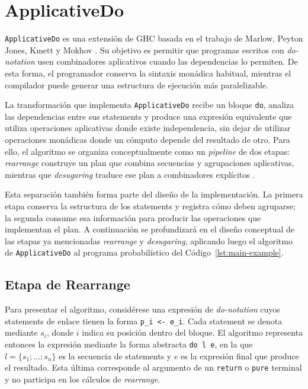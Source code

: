 
\section{ApplicativeDo}

\texttt{ApplicativeDo} es una extensión de \textsf{GHC} basada en el trabajo de Marlow, Peyton Jones, Kmett y Mokhov \cite{MarlowPJKM2016}. Su objetivo es permitir que programas escritos con \textit{do-notation} usen combinadores aplicativos cuando las dependencias lo permiten. De esta forma, el programador conserva la sintaxis monádica habitual, mientras el compilador puede generar una estructura de ejecución más paralelizable.

La transformación que implementa \texttt{ApplicativeDo} recibe un bloque \texttt{do}, analiza las dependencias entre sus statements y produce una expresión equivalente que utiliza operaciones aplicativas donde existe independencia, sin dejar de utilizar operaciones monádicas donde un cómputo depende del resultado de otro. Para ello, el algoritmo se organiza conceptualmente como un \textit{pipeline} de dos etapas: \textit{rearrange} construye un plan que combina secuencias y agrupaciones aplicativas, mientras que \textit{desugaring} traduce ese plan a combinadores explícitos \cite[pp.~95--96]{MarlowPJKM2016}.

Esta separación también forma parte del diseño de la implementación. La primera etapa conserva la estructura de los statements y registra cómo deben agruparse; la segunda consume esa información para producir las operaciones que implementan el plan. A continuación se profundizará en el diseño conceptual de las etapas ya mencionadas \textit{rearrange} y \textit{desugaring}, aplicando luego el algoritmo de \texttt{ApplicativeDo} al programa probabilístico del Código~\ref{lst:main-example}.

\subsection{Etapa de Rearrange}
\label{sec:applicative-do-rearrange}

Para presentar el algoritmo, considérese una expresión de \textit{do-notation} cuyos statements de enlace tienen la forma \verb|p_i <- e_i|. Cada statement se denota mediante $s_i$, donde $i$ indica su posición dentro del bloque. El algoritmo representa entonces la expresión mediante la forma abstracta \verb|do l e|, en la que $l=\{s_1;\ldots;s_n\}$ es la secuencia de statements y $e$ es la expresión final que produce el resultado. Esta última corresponde al argumento de un \texttt{return} o \texttt{pure} terminal y no participa en los cálculos de \textit{rearrange}.

